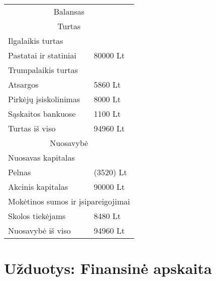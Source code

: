\begin{tasks}
\begin{task}
\begin{solution}
      \begin{tabularx}{\tablewidth}[]{l | X}
        \multicolumn{2}{c}{Balansas} \\
        \multicolumn{2}{c}{Turtas} \\
        \hline
        \multicolumn{2}{l}{Ilgalaikis turtas} \\
        Pastatai ir statiniai & 80000 Lt \\
        \multicolumn{2}{l}{Trumpalaikis turtas} \\
        Atsargos & 5860 Lt \\
        Pirkėjų įsiskolinimas & 8000 Lt \\
        Sąskaitos bankuose & 1100 Lt \\
        \hline
        Turtas iš viso & 94960 Lt \\
        \multicolumn{2}{c}{Nuosavybė} \\
        \hline
        \multicolumn{2}{l}{Nuosavas kapitalas} \\
        Pelnas & (3520) Lt \\
        Akcinis kapitalas & 90000 Lt \\
        \multicolumn{2}{l}{Mokėtinos sumos ir įsipareigojimai} \\
        Skolos tiekėjams & 8480 Lt \\
        \hline
        Nuosavybė iš viso & 94960 Lt \\
      \end{tabularx}

    \end{solution}
  \end{task}

\end{tasks}

\chapter{Užduotys: Finansinė apskaita}


